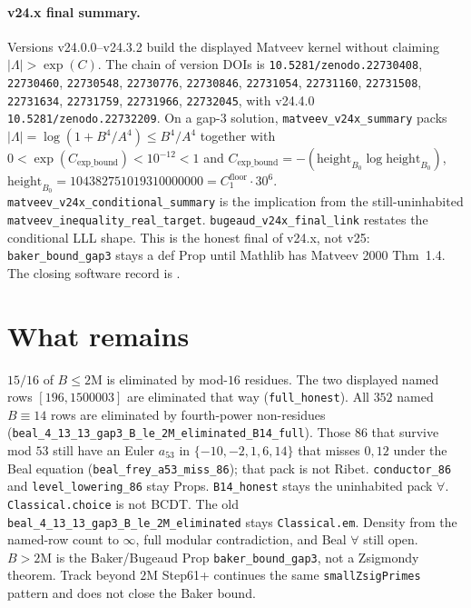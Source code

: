 \documentclass[12pt]{amsart}
\begin{document}
\paragraph{v24.x final summary.}
Versions v24.0.0--v24.3.2 build the displayed
Matveev kernel without claiming
$|\Lambda|>\exp(C)$.
The chain of version DOIs is
\texttt{10.5281/zenodo.22730408},
\texttt{22730460},
\texttt{22730548},
\texttt{22730776},
\texttt{22730846},
\texttt{22731054},
\texttt{22731160},
\texttt{22731508},
\texttt{22731634},
\texttt{22731759},
\texttt{22731966},
\texttt{22732045},
with v24.4.0
\texttt{10.5281/zenodo.22732209}.
On a gap-3 solution,
\texttt{matveev\_v24x\_summary}
packs
$|\Lambda|=\log(1+B^4/A^4)\le B^4/A^4$
together with
$0<\exp(C_{\mathrm{exp\_bound}})<10^{-12}<1$
and
$C_{\mathrm{exp\_bound}}=-(\mathrm{height}_{B_0}\log\mathrm{height}_{B_0})$,
$\mathrm{height}_{B_0}=104382751019310000000=C_1^{\mathrm{floor}}\cdot 30^6$.
\texttt{matveev\_v24x\_conditional\_summary}
is the implication from the still-uninhabited
\texttt{matveev\_inequality\_real\_target}.
\texttt{bugeaud\_v24x\_final\_link}
restates the conditional LLL shape.
This is the honest final of v24.x, not v25:
\texttt{baker\_bound\_gap3} stays a def Prop
until Mathlib has Matveev 2000 Thm~1.4.
The closing software record is
\cite{beal_level26_v24_4_0}.

\section{What remains}
$15/16$ of $B\le 2\text{M}$ is eliminated by mod-$16$ residues.
The two displayed named rows $[196,1500003]$ are
eliminated that way (\texttt{full\_honest}).
All $352$ named $B\equiv 14$ rows are eliminated by
fourth-power non-residues
(\texttt{beal\_4\_13\_13\_gap3\_B\_le\_2M\_eliminated\_B14\_full}).
Those $86$ that survive mod $53$ still have an Euler
$a_{53}$ in $\{-10,-2,1,6,14\}$ that misses $0,12$
under the Beal equation
(\texttt{beal\_frey\_a53\_miss\_86});
that pack is not Ribet.
\texttt{conductor\_86} and
\texttt{level\_lowering\_86} stay Props.
\texttt{B14\_honest} stays the uninhabited pack
$\forall$.
\texttt{Classical.choice} is not BCDT.
The old \texttt{beal\_4\_13\_13\_gap3\_B\_le\_2M\_eliminated}
stays \texttt{Classical.em}.
Density from the named-row count to $\infty$,
full modular contradiction, and Beal $\forall$
still open.
$B>2\mathrm{M}$ is the Baker/Bugeaud Prop
\texttt{baker\_bound\_gap3}, not a Zsigmondy theorem.
Track beyond $2\text{M}$ Step61+ continues the same
\texttt{smallZsigPrimes} pattern and does not close
the Baker bound.
\end{document}
